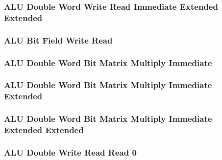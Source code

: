 \subsubsection[{\small ALU Double Word Write Read Immediate Extended Extended}]{ALU Double Word Write Read Immediate Extended Extended} \label{sec:format-ALU-DWRI.Y}



\subsubsection[{\small ALU Bit Field Write Read}]{ALU Bit Field Write Read} \label{sec:format-ALU-BFWR}



\subsubsection[{\small ALU Double Word Bit Matrix Multiply Immediate}]{ALU Double Word Bit Matrix Multiply Immediate} \label{sec:format-ALU-DBMWRI}



\subsubsection[{\small ALU Double Word Bit Matrix Multiply Immediate Extended}]{ALU Double Word Bit Matrix Multiply Immediate Extended} \label{sec:format-ALU-DBMWRI.X}



\subsubsection[{\small ALU Double Word Bit Matrix Multiply Immediate Extended Extended}]{ALU Double Word Bit Matrix Multiply Immediate Extended Extended} \label{sec:format-ALU-DBMWRI.Y}



\subsubsection[{\small ALU Double Write Read Read 0}]{ALU Double Write Read Read 0} \label{sec:format-ALU-DWRR0}

